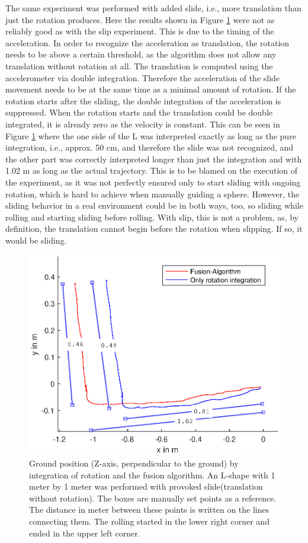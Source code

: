 \documentclass[letterpaper, 10 pt, conference]{ieeeconf}  %
\begin{document}
The same experiment was performed with added slide, i.e., more translation than just the rotation produces.
Here the results shown in Figure \ref{LTestSlide} were not as reliably good as with the slip experiment.
This is due to the timing of the acceleration. In order to recognize the acceleration as translation, the rotation needs to be above a certain threshold, as the algorithm does not allow any translation without rotation at all.
The translation is computed using the accelerometer via double integration.
Therefore the acceleration of the slide movement needs to be at the same time as a minimal amount of rotation. 
If the rotation starts after the sliding, the double integration of the acceleration is suppressed.
When the rotation starts and the translation could be double integrated, it is already zero as the velocity is constant.
This can be seen in Figure \ref{LTestSlide} where the one side of the L was interpreted exactly as long as the pure integration, i.e., approx. 50 cm, and therefore the slide was not recognized, and the other part was correctly interpreted longer than just the integration and with 1.02 m as long as the actual trajectory.
This is to be blamed on the execution of the experiment, as it was not perfectly ensured only to start sliding with ongoing rotation, which is hard to achieve when manually guiding a sphere.
However, the sliding behavior in a real environment could be in both ways, too, so sliding while rolling and starting sliding before rolling.
With slip, this is not a problem, as, by definition, the translation cannot begin before the rotation when slipping.
If so, it would be sliding.
\begin{figure}
\includegraphics[width=\linewidth]{./graphics/LTestSlide.eps}
\caption{Ground position (Z-axis, perpendicular to the ground) by integration of rotation and the fusion algorithm. An L-shape with 1 meter by 1 meter was performed with provoked slide(translation without rotation). The boxes are manually set points as a reference. The distance in meter between these points is written on the lines connecting them. The rolling started in the lower right corner and ended in the upper left corner.}
\label{LTestSlide}
\end{figure}
\end{document}
